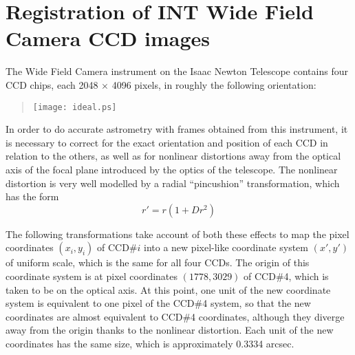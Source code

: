 \documentclass[11pt]{article}
\begin{document}
\section{Registration of INT Wide Field Camera CCD images}

The Wide Field Camera instrument on the Isaac Newton Telescope 
contains four CCD chips, each 2048 $\times$ 4096 pixels, 
in roughly the following orientation:
\begin{quote}
\begin{center}
\texttt{[image: ideal.ps]}
\end{center}
\end{quote}
In order to do accurate astrometry with frames obtained
from this instrument, it is necessary to correct for the 
exact orientation and position of each CCD in relation to
the others, as well as for nonlinear distortions
away from the optical axis of the focal plane introduced by
the optics of the telescope.
The nonlinear distortion is very well modelled by a radial ``pincushion''
transformation, which has the form
\begin{displaymath}
  r' = r ( 1 + D r^2 )
\end{displaymath}

The following transformations take account of both these effects
to map the pixel coordinates $(x_i, y_i)$
of CCD\#$i$ into a new pixel-like coordinate system 
$(x', y')$
of uniform scale, which is the same for all four CCDs.
The origin of this coordinate system is at pixel coordinates
$(1778, 3029)$ of CCD\#4, which is taken to be on the optical axis.
At this point, one unit of the new coordinate system is equivalent
to one pixel of the CCD\#4 system, so that the new coordinates 
are almost equivalent to CCD\#4 coordinates, although they diverge
away from the origin thanks to the nonlinear distortion.
Each unit of the new coordinates has the same size, 
which is approximately 0.3334 arcsec.
\end{document}
